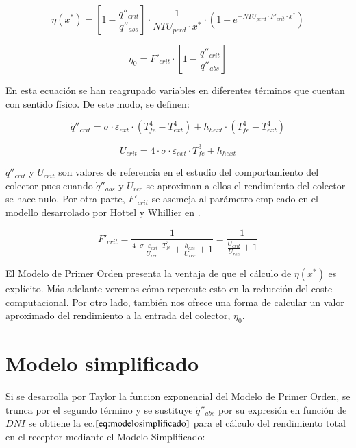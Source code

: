 \begin{equation}
    \eta(x^{*}) = \left[1-\frac{\dot q''_{crit}}{\dot q''_{abs}}\right] \cdot \frac{1}{NTU_{perd} \cdot x^{*}} \cdot \left(1-e^{-NTU_{perd}\cdot F'_{crit}\cdot x^{*}}\right) 
    \label{eq:primerorden}
\end{equation}

\begin{equation}
    \eta_{0} = F'_{crit} \cdot \left[1-\frac{\dot q''_{crit}}{\dot q''_{abs}}\right] 
    \label{eq:rendimiento0aproximado}
\end{equation}

En esta ecuación se han reagrupado variables en diferentes términos que cuentan con sentido físico. De este modo, se definen:

\begin{equation}
    \dot q''_{crit} = \sigma \cdot \varepsilon_{ext} \cdot \left(T^{4}_{fe}- T^{4}_{ext}\right)+h_{hext} \cdot \left(T^{4}_{fe}- T^{4}_{ext}\right)
    \label{eq:qcrit}
\end{equation}

\begin{equation}
    U_{crit} = 4 \cdot \sigma \cdot \varepsilon_{ext} \cdot T^{3}_{fe} + h_{hext}
    \label{eq:ucrit}
\end{equation}

\(\dot q''_{crit}\) y \(U_{crit}\) son valores de referencia en el estudio del comportamiento del colector pues cuando \(\dot q''_{abs}\) y \(U_{rec}\) se aproximan a ellos el rendimiento del colector se hace nulo. Por otra parte, \(F'_{crit}\) se asemeja al parámetro empleado en el modello desarrolado por Hottel y Whillier en \cite{1022085/DVRL97SH}.

\begin{equation}
    F'_{crit} = \frac{1}{\frac{4 \cdot \sigma \cdot \varepsilon_{ext} \cdot T^{3}_{fe}}{U_{rec}} + \frac{h_{ext}}{U_{rec}} +1} = \frac{1}{\frac{U_{crit}}{U_{rec}}+1}
    \label{eq:fcrit}
\end{equation}

El Modelo de Primer Orden presenta la ventaja de que el cálculo de \(\eta(x^{*})\) es explícito. Más adelante veremos cómo repercute esto en la reducción del coste computacional. Por otro lado, también nos ofrece una forma de calcular un valor aproximado del rendimiento a la entrada del colector, \(\eta_{0}\).

\section{Modelo simplificado}
Si se desarrolla por Taylor la funcion exponencial del Modelo de Primer Orden, se trunca por el segundo término y se sustituye \(\dot q''_{abs}\) por su expresión en función de \(DNI\) se obtiene la ec.\(\eqref{eq:modelosimplificado}\) para el cálculo del rendimiento total en el receptor mediante el Modelo Simplificado:

